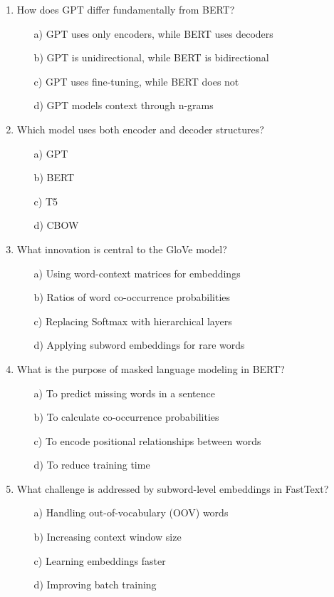 \documentclass[8pt]{extarticle}
\begin{document}
\begin{multicols}{2}
\begin{enumerate}
\item How does GPT differ fundamentally from BERT?
\begin{itemize}
\item[a)] GPT uses only encoders, while BERT uses decoders
\item[b)] GPT is unidirectional, while BERT is bidirectional
\item[c)] GPT uses fine-tuning, while BERT does not
\item[d)] GPT models context through n-grams
\end{itemize}

\item Which model uses both encoder and decoder structures?
\begin{itemize}
\item[a)] GPT
\item[b)] BERT
\item[c)] T5
\item[d)] CBOW
\end{itemize}

\item What innovation is central to the GloVe model?
\begin{itemize}
\item[a)] Using word-context matrices for embeddings
\item[b)] Ratios of word co-occurrence probabilities
\item[c)] Replacing Softmax with hierarchical layers
\item[d)] Applying subword embeddings for rare words
\end{itemize}

\item What is the purpose of masked language modeling in BERT?
\begin{itemize}
\item[a)] To predict missing words in a sentence
\item[b)] To calculate co-occurrence probabilities
\item[c)] To encode positional relationships between words
\item[d)] To reduce training time
\end{itemize}

\item What challenge is addressed by subword-level embeddings in FastText?
\begin{itemize}
\item[a)] Handling out-of-vocabulary (OOV) words
\item[b)] Increasing context window size
\item[c)] Learning embeddings faster
\item[d)] Improving batch training
\end{itemize}


\end{enumerate}
\end{multicols}
\end{document}
